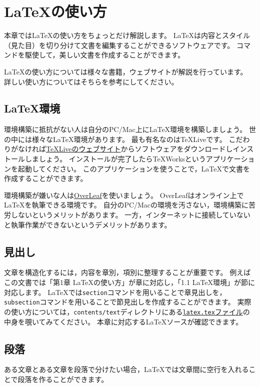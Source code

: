 \section{LaTeXの使い方}
本章ではLaTeXの使い方をちょっとだけ解説します。
LaTeXは内容とスタイル（見た目）を切り分けて文書を編集することができるソフトウェアです。
コマンドを駆使して，美しい文書を作成することができます。

LaTeXの使い方については様々な書籍，ウェブサイトが解説を行っています。
詳しい使い方についてはそちらを参考にしてください。


\subsection{LaTeX環境}
環境構築に抵抗がない人は自分のPC/Mac上にLaTeX環境を構築しましょう。
世の中には様々なLaTeX環境があります。
最も有名なのはTeXLiveです。
こだわりがなければ\href{https://texwiki.texjp.org/?TeX%20Live%2FWindows}{TeXLiveのウェブサイト}からソフトウェアをダウンロードしインストールしましょう。
インストールが完了したらTeXWorksというアプリケーションを起動してください。
このアプリケーションを使うことで，LaTeXで文書を作成することができます。

環境構築が嫌いな人は\href{https://ja.overleaf.com}{OverLeaf}を使いましょう。
OverLeafはオンライン上でLaTeXを執筆できる環境です。
自分のPC/Macの環境を汚さない，環境構築に苦労しないというメリットがあります。
一方，インターネットに接続していないと執筆作業ができないというデメリットがあります。

\subsection{見出し}
文章を構造化するには，内容を章別，項別に整理することが重要です。
例えばこの文書では「第1章 LaTeXの使い方」が章に対応し，「1.1 LaTeX環境」が節に対応します。
LaTeXでは\texttt{section}コマンドを用いることで章見出しを，\texttt{subsection}コマンドを用いることで節見出しを作成することができます。
実際の使い方については，\texttt{contents/text}ディレクトリにある\href{https://github.com/ymmt3-lab/DEIM-and-Thesis/blob/master/contents/text/latex.tex}{\texttt{latex.tex}ファイル}の中身を覗いてみてください。
本章に対応するLaTeXソースが確認できます。


\subsection{段落}
ある文章とある文章を段落で分けたい場合，LaTeXでは文章間に空行を入れることで段落を作ることができます。

